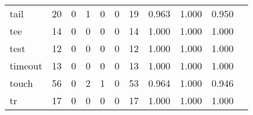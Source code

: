 \begin{longtable}{lp{1.2cm}p{1.2cm}p{1.2cm}p{1.2cm}p{1.2cm}p{1.2cm}p{1.2cm}p{1.2cm}p{1.2cm}p{1.2cm}}
tail      &                                    20 &                                                  0 &                                                  1 &                                                  0 &                                                  0 &                                                 19 &                                         0.963 &                                              1.000 &                                              0.950 \\
tee       &                                    14 &                                                  0 &                                                  0 &                                                  0 &                                                  0 &                                                 14 &                                         1.000 &                                              1.000 &                                              1.000 \\
test      &                                    12 &                                                  0 &                                                  0 &                                                  0 &                                                  0 &                                                 12 &                                         1.000 &                                              1.000 &                                              1.000 \\
timeout   &                                    13 &                                                  0 &                                                  0 &                                                  0 &                                                  0 &                                                 13 &                                         1.000 &                                              1.000 &                                              1.000 \\
touch     &                                    56 &                                                  0 &                                                  2 &                                                  1 &                                                  0 &                                                 53 &                                         0.964 &                                              1.000 &                                              0.946 \\
tr        &                                    17 &                                                  0 &                                                  0 &                                                  0 &                                                  0 &                                                 17 &                                         1.000 &                                              1.000 &                                              1.000 \\

\end{longtable}
